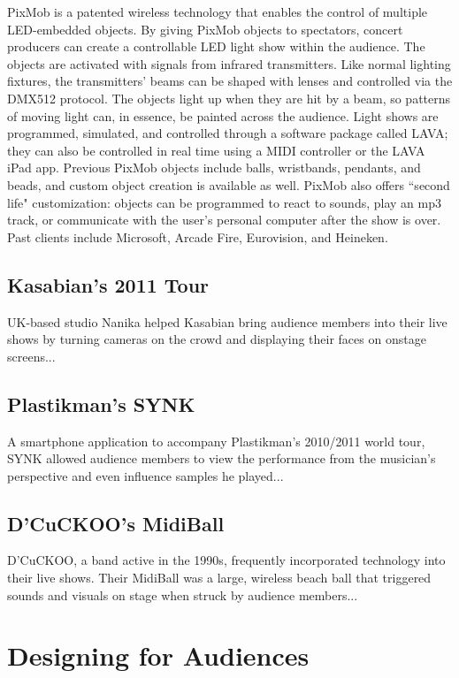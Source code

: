 PixMob is a patented wireless technology that enables the control of multiple LED-embedded objects. By giving PixMob objects to spectators, concert producers can create a controllable LED light show within the audience. The objects are activated with signals from infrared transmitters. Like normal lighting fixtures, the transmitters' beams can be shaped with lenses and controlled via the DMX512 protocol. The objects light up when they are hit by a beam, so patterns of moving light can, in essence, be painted across the audience. Light shows are programmed, simulated, and controlled through a software package called LAVA; they can also be controlled in real time using a MIDI controller or the LAVA iPad app. Previous PixMob objects include balls, wristbands, pendants, and beads, and custom object creation is available as well. PixMob also offers ``second life" customization: objects can be programmed to react to sounds, play an mp3 track, or communicate with the user's personal computer after the show is over. Past clients include Microsoft, Arcade Fire, Eurovision, and Heineken.

\subsection{Kasabian's 2011 Tour}

UK-based studio Nanika helped Kasabian bring audience members into their live shows by turning cameras on the crowd and displaying their faces on onstage screens...

\subsection{Plastikman's SYNK}

A smartphone application to accompany Plastikman's 2010/2011 world tour, SYNK allowed audience members to view the performance from the musician's perspective and even influence samples he played...

\subsection{D'CuCKOO's MidiBall}

D'CuCKOO, a band active in the 1990s, frequently incorporated technology into their live shows. Their MidiBall was a large, wireless beach ball that triggered sounds and visuals on stage when struck by audience members...


\section{Designing for Audiences}

